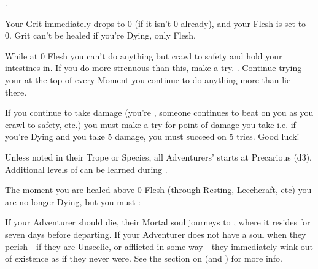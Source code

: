 
 .  


Your Grit immediately drops to 0 (if it isn't 0 already), and your Flesh is set to 0. Grit can't be healed if you're Dying, only Flesh.

  While at 0 Flesh you can't do anything but crawl to safety and hold your intestines in. If you do  more strenuous than this, make a \DEATH try. . Continue trying your \DEATH at the top of every Moment you continue to do anything more than lie there. 

  If you continue to take damage (you're , someone continues to beat on you as you crawl to safety, etc.) you must make a \DEATH try for  point of damage you take i.e. if you're Dying and you take 5 damage, you must succeed on 5 \DEATH tries.  Good luck!

  Unless noted in their Trope or Species, all Adventurers' \DEATH starts at Precarious (d3).  Additional levels of \DEATH can be learned during .

  The moment you are healed above 0 Flesh (through Resting, Leechcraft, etc) you are no longer Dying, but you must : 


\cbreak


If your Adventurer should die, their Mortal soul journeys to , where it resides for seven days before departing. If your Adventurer does not have a soul when they perish - if they are Unseelie, or afflicted in some way - they immediately wink out of existence as if they never were.  See the section on  (and ) for more info.



